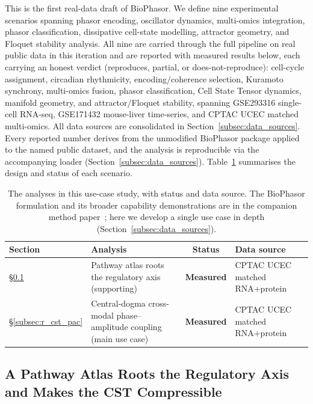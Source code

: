 \documentclass[preprint,12pt,amsmath,amssymb,superscriptaddress,floatfix]{revtex4-2}
\begin{document}
This is the first real-data draft of BioPhasor. We define nine experimental
scenarios spanning phasor encoding, oscillator dynamics, multi-omics
integration, phasor classification, dissipative cell-state modelling,
attractor geometry, and Floquet stability analysis. All nine are
carried through the full pipeline on real public data in this iteration
and are reported with measured results below, each carrying an honest verdict
(reproduces, partial, or does-not-reproduce): cell-cycle assignment, circadian
rhythmicity, encoding/coherence selection, Kuramoto synchrony, multi-omics
fusion, phasor classification, Cell State Tensor dynamics, manifold geometry,
and attractor/Floquet stability, spanning GSE293316 single-cell RNA-seq,
GSE171432 mouse-liver time-series, and CPTAC UCEC matched multi-omics. All
data sources are consolidated in Section~\ref{subsec:data_sources}. Every
reported number derives from the
unmodified BioPhasor package applied to the named public dataset, and the
analysis is reproducible via the accompanying loader
(Section~\ref{subsec:data_sources}). Table~\ref{tab:experiments} summarises
the design and status of each scenario.

\begin{table}[h]
\centering
\caption{The analyses in this use-case study, with status and data source. The
BioPhasor formulation and its broader capability demonstrations are in the
companion method paper~\cite{biophasor_platform}; here we develop a single use
case in depth (Section~\ref{subsec:data_sources}).}
\label{tab:experiments}
\begin{tabular}{p{2.6cm}p{4.4cm}cp{4.0cm}}
\toprule
\textbf{Section} & \textbf{Analysis} & \textbf{Status} & \textbf{Data source} \\
\midrule
\S\ref{subsec:r_cst_pathway} & Pathway atlas roots the regulatory axis
  (supporting) & \textbf{Measured} & CPTAC UCEC matched RNA+protein \\
\S\ref{subsec:r_cst_pac} & Central-dogma cross-modal phase--amplitude coupling
  (main use case) & \textbf{Measured} & CPTAC UCEC matched RNA+protein \\
\bottomrule
\end{tabular}
\end{table}

\subsection{A Pathway Atlas Roots the Regulatory Axis and Makes the CST Compressible}
\label{subsec:r_cst_pathway}
\end{document}
